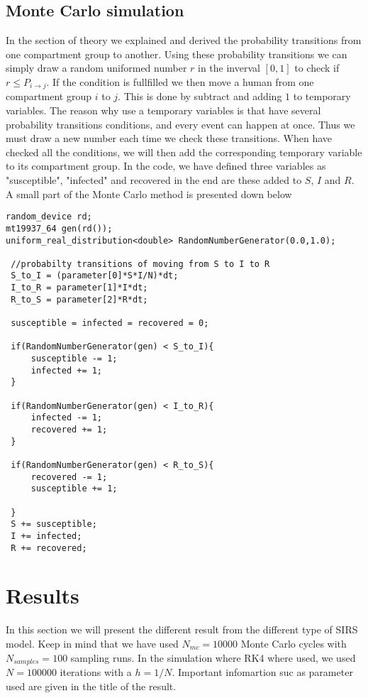 \documentclass[a4paper, 10pt]{article}
\begin{document}
\subsection{Monte Carlo simulation} In the section of theory we explained and derived
the probability transitions from one compartment group to another. Using these probability transitions we can simply draw a
random uniformed number $r$ in the inverval $[0,1]$ to check if $r \le P_{i\to j}$. If the condition is fullfilled
we then move a human from one compartment group $i$ to $j$. This is done by subtract and adding $1$ to temporary
variables. The reason why use a temporary variables is that have several probability transitions conditions, and
every event can happen at once. Thus we must draw a new number each time we check these transitions. When have checked all the conditions,
we will then add the corresponding temporary variable to its compartment group. In the code, we have defined
three variables as "susceptible", "infected" and recovered in the end are these added to $S$, $I$ and $R$.
A small part of the Monte Carlo method is presented down below
\begin{lstlisting}
random_device rd;
mt19937_64 gen(rd());
uniform_real_distribution<double> RandomNumberGenerator(0.0,1.0);

 //probabilty transitions of moving from S to I to R
 S_to_I = (parameter[0]*S*I/N)*dt;
 I_to_R = parameter[1]*I*dt;
 R_to_S = parameter[2]*R*dt;

 susceptible = infected = recovered = 0;

 if(RandomNumberGenerator(gen) < S_to_I){
     susceptible -= 1;
     infected += 1;
 }

 if(RandomNumberGenerator(gen) < I_to_R){
     infected -= 1;
     recovered += 1;
 }

 if(RandomNumberGenerator(gen) < R_to_S){
     recovered -= 1;
     susceptible += 1;

 }
 S += susceptible;
 I += infected;
 R += recovered;
\end{lstlisting}

\section{Results}
In this section we will present the different result from the different type of SIRS
model. Keep in mind that we have used $N_{mc} = 10000$ Monte Carlo cycles with $N_{samples} = 100$ sampling runs.
In the simulation where RK4 where used, we used $N = 100000$ iterations with a $h = 1/N$. Important infomartion suc as parameter
used are given in the title of the result.
\end{document}
